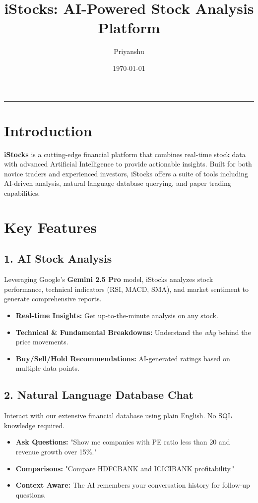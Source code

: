 \documentclass[a4paper,12pt]{article}
\title{\textbf{iStocks: AI-Powered Stock Analysis Platform}}
\author{Priyanshu}
\date{\today}
\begin{document}
\maketitle

\tableofcontents
\vspace{1em}
\hrule
\vspace{1em}

\section{Introduction}
\textbf{iStocks} is a cutting-edge financial platform that combines real-time stock data with advanced Artificial Intelligence to provide actionable insights. Built for both novice traders and experienced investors, iStocks offers a suite of tools including AI-driven analysis, natural language database querying, and paper trading capabilities.

\section{Key Features}

\subsection{1. AI Stock Analysis}
Leveraging Google's \textbf{Gemini 2.5 Pro} model, iStocks analyzes stock performance, technical indicators (RSI, MACD, SMA), and market sentiment to generate comprehensive reports.
\begin{itemize}
    \item \textbf{Real-time Insights:} Get up-to-the-minute analysis on any stock.
    \item \textbf{Technical \& Fundamental Breakdowns:} Understand the \textit{why} behind the price movements.
    \item \textbf{Buy/Sell/Hold Recommendations:} AI-generated ratings based on multiple data points.
\end{itemize}

\subsection{2. Natural Language Database Chat}
Interact with our extensive financial database using plain English. No SQL knowledge required.
\begin{itemize}
    \item \textbf{Ask Questions:} "Show me companies with PE ratio less than 20 and revenue growth over 15\%."
    \item \textbf{Comparisons:} "Compare HDFCBANK and ICICIBANK profitability."
    \item \textbf{Context Aware:} The AI remembers your conversation history for follow-up questions.
\end{itemize}
\end{document}
